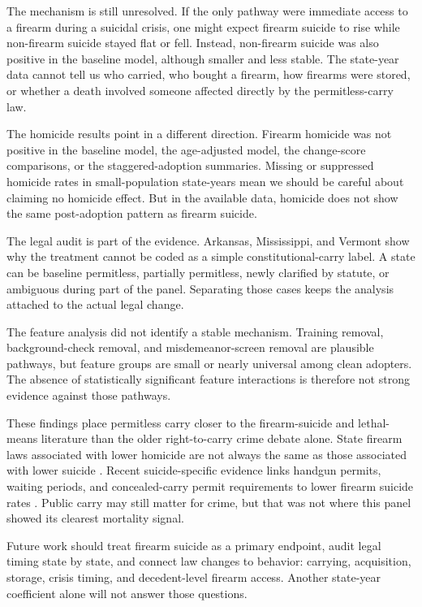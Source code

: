 \documentclass[11pt]{article}
\begin{document}
The mechanism is still unresolved. If the only pathway were immediate access to a firearm during a suicidal crisis, one might expect firearm suicide to rise while non-firearm suicide stayed flat or fell. Instead, non-firearm suicide was also positive in the baseline model, although smaller and less stable. The state-year data cannot tell us who carried, who bought a firearm, how firearms were stored, or whether a death involved someone affected directly by the permitless-carry law.

The homicide results point in a different direction. Firearm homicide was not positive in the baseline model, the age-adjusted model, the change-score comparisons, or the staggered-adoption summaries. Missing or suppressed homicide rates in small-population state-years mean we should be careful about claiming no homicide effect. But in the available data, homicide does not show the same post-adoption pattern as firearm suicide.

The legal audit is part of the evidence. Arkansas, Mississippi, and Vermont show why the treatment cannot be coded as a simple constitutional-carry label. A state can be baseline permitless, partially permitless, newly clarified by statute, or ambiguous during part of the panel. Separating those cases keeps the analysis attached to the actual legal change.

The feature analysis did not identify a stable mechanism. Training removal, background-check removal, and misdemeanor-screen removal are plausible pathways, but feature groups are small or nearly universal among clean adopters. The absence of statistically significant feature interactions is therefore not strong evidence against those pathways.

These findings place permitless carry closer to the firearm-suicide and lethal-means literature than the older right-to-carry crime debate alone. State firearm laws associated with lower homicide are not always the same as those associated with lower suicide \citep{siegel2019,sharkey2023}. Recent suicide-specific evidence links handgun permits, waiting periods, and concealed-carry permit requirements to lower firearm suicide rates \citep{siegel2026}. Public carry may still matter for crime, but that was not where this panel showed its clearest mortality signal.

Future work should treat firearm suicide as a primary endpoint, audit legal timing state by state, and connect law changes to behavior: carrying, acquisition, storage, crisis timing, and decedent-level firearm access. Another state-year coefficient alone will not answer those questions.
\end{document}
